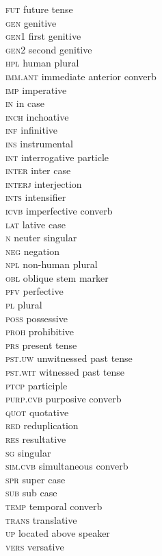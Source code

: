 \documentclass[output=paper]{LSP/langsci}
\begin{document}
\begin{multicols}{2}
\begin{tabbing}
\textsc{fut} \> future tense\\
\textsc{gen} \> genitive\\
\textsc{gen1} \> first genitive\\
\textsc{gen2}  \> second genitive\\
\textsc{hpl} \> human plural\\
\textsc{imm.ant} \> immediate anterior converb\\
\textsc{imp} \> imperative\\
\textsc{in} \> in case\\
\textsc{inch} \> inchoative\\
\textsc{inf} \> infinitive\\
\textsc{ins} \> instrumental\\
\textsc{int} \> interrogative particle\\
\textsc{inter}  \> inter case\\
\textsc{interj} \> interjection\\
\textsc{ints} \> intensifier\\
\textsc{icvb} \> imperfective converb\\
\textsc{lat} \> lative case\\
\textsc{n} \> neuter singular\\
\textsc{neg} \> negation\\
\textsc{npl} \> non-human plural\\
\textsc{obl} \> oblique stem marker\\
\textsc{pfv} \> perfective\\
\textsc{pl} \> plural\\
\textsc{poss} \> possessive\\
\textsc{proh} \> prohibitive\\
\textsc{prs} \> present tense\\
\textsc{pst.uw} \> unwitnessed past tense\\
\textsc{pst.wit} \> witnessed past tense\\
\textsc{ptcp} \> participle\\
\textsc{purp.cvb} \> purposive  converb\\
\textsc{quot} \> quotative\\
\textsc{red} \> reduplication\\
\textsc{res} \> resultative\\
\textsc{sg} \> singular\\
\textsc{sim.cvb} \> simultaneous converb\\
\textsc{spr} \> super case\\
\textsc{sub} \> sub case\\
\textsc{temp} \> temporal  converb\\
\textsc{trans} \> translative\\
\textsc{up} \> located above speaker\\
\textsc{vers} \> versative
\end{tabbing}
\end{multicols}


\sloppy

\printbibliography[heading=subbibliography,notkeyword=this]
\end{document}
